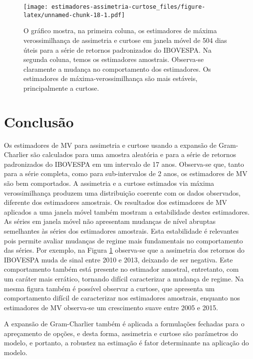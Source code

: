 \documentclass[]{article}
\begin{document}
\begin{figure}
\centering
\texttt{[image: estimadores-assimetria-curtose\_files/figure-latex/unnamed-chunk-18-1.pdf]}
\caption{\label{fig:mle-skewness-kurtosis-ma} O gráfico mostra, na
primeira coluna, os estimadores de máxima verossimilhança de assimetria
e curtose em janela móvel de 504 dias úteis para a série de retornos
padronizados do IBOVESPA. Na segunda coluna, temos os estimadores
amostrais. Observa-se claramente a mudança no comportamento dos
estimadores. Os estimadores de máxima-verossimilhança são mais estáveis,
principalmente a curtose.}
\end{figure}

\section{Conclusão}\label{conclusao}

Os estimadores de MV para assimetria e curtose usando a expansão de
Gram-Charlier são calculados para uma amostra aleatória e para a série
de retornos padronizados do IBOVESPA em um intervalo de 17 anos.
Observa-se que, tanto para a série completa, como para sub-intervalos de
2 anos, os estimadores de MV são bem comportados. A assimetria e a
curtose estimados via máxima verossimilhança produzem uma distribuição
coerente com os dados observados, diferente dos estimadores amostrais.
Os resultados dos estimadores de MV aplicados a uma janela móvel também
mostram a estabilidade destes estimadores. As séries em janela móvel não
apresentam mudanças de nível abruptas semelhantes às séries dos
estimadores amostrais. Esta estabilidade é relevantes pois permite
avaliar mudanças de regime mais fundamentais no comportamento das
séries. Por exemplo, na Figura \ref{fig:mle-skewness-kurtosis-ma}
observa-se que a assimetria dos retornos do IBOVESPA muda de sinal entre
2010 e 2013, deixando de ser negativa. Este comportamento também está
presente no estimador amostral, entretanto, com um caráter mais
errático, tornando difícil caracterizar a mudança de regime. Na mesma
figura também é possível observar a curtose, que apresenta um
comportamento difícil de caracterizar nos estimadores amostrais,
enquanto nos estimadores de MV observa-se um crescimento suave entre
2005 e 2015.

A expansão de Gram-Charlier também é aplicada a formulações fechadas
para o apreçamento de opções, e desta forma, assimetria e curtose são
parâmetros do modelo, e portanto, a robustez na estimação é fator
determinante na aplicação do modelo.
\end{document}
